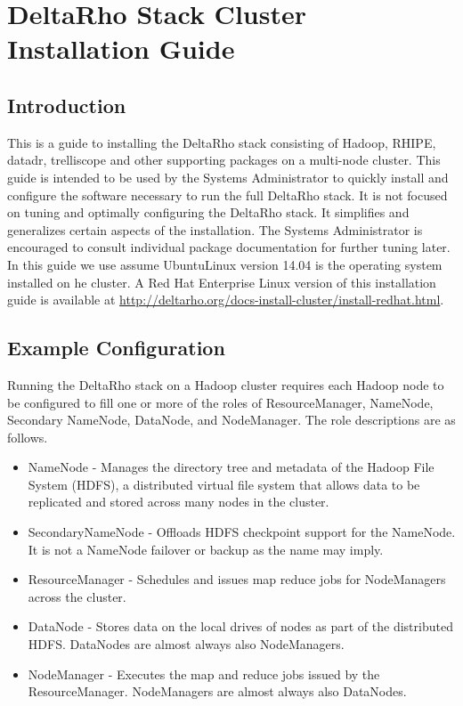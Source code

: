 \section{DeltaRho Stack Cluster Installation Guide}
\subsection{Introduction}
This is a guide to installing the DeltaRho stack consisting of
Hadoop\textregistered, RHIPE, datadr, trelliscope and other supporting
packages on a multi-node cluster.  This guide is intended to be used
by the Systems Administrator to quickly install and configure the
software necessary to run the full DeltaRho stack.  It is not focused
on tuning and optimally configuring the DeltaRho stack.  It simplifies
and generalizes certain aspects of the installation.  The Systems
Administrator is encouraged to consult individual package
documentation for further tuning later.  In this guide we use assume
Ubuntu\textregistered Linux version 14.04 is the operating system
installed on he cluster.  A Red Hat Enterprise Linux version of this
installation guide is available at
\url{http://deltarho.org/docs-install-cluster/install-redhat.html}.


\subsection{Example Configuration}
Running the DeltaRho stack on a Hadoop cluster requires each Hadoop node to be configured to fill one or more of the roles of ResourceManager, NameNode, Secondary NameNode, DataNode, and NodeManager. The role descriptions are as follows.

\begin{itemize}
\item NameNode - Manages the directory tree and metadata of the Hadoop File System (HDFS), a distributed virtual file system that allows data to be replicated and stored across many nodes in the cluster.
\item SecondaryNameNode - Offloads HDFS checkpoint support for the NameNode.  It is not a NameNode failover or backup as the name may imply.
\item ResourceManager - Schedules and issues map reduce jobs for NodeManagers across the cluster.
\item DataNode - Stores data on the local drives of nodes as part of the distributed HDFS.  DataNodes are almost always also NodeManagers.
\item NodeManager - Executes the map and reduce jobs issued by the ResourceManager. NodeManagers are almost always also DataNodes.
\end{itemize}

